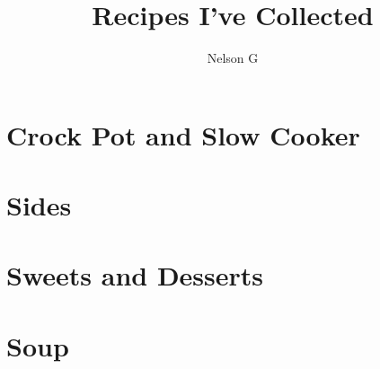\documentclass{book}
\title{Recipes I've Collected}
\author{Nelson G}
\begin{document}
\pagestyle{empty}
\maketitle
\tableofcontents

\pagestyle{main}

%

\chapter{Crock Pot and Slow Cooker}



















\chapter{Sides}



\chapter{Sweets and Desserts}






\chapter{Soup}

\end{document}
